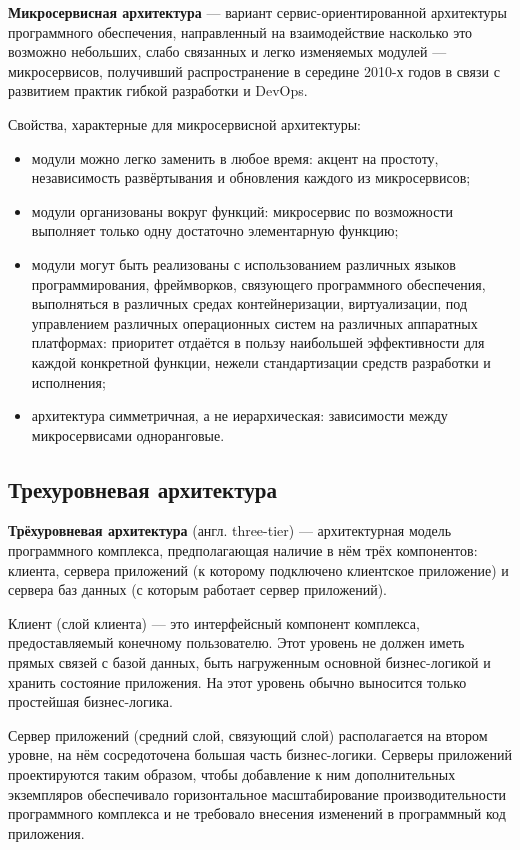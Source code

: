 \documentclass[specification,annotation,times]{itmo-student-thesis}
\begin{document}
\textbf{Микросервисная архитектура} \label{microservice-architecture} — вариант сервис-ориентированной архитектуры программного обеспечения, направленный на взаимодействие насколько это возможно небольших, слабо связанных и легко изменяемых модулей — микросервисов, получивший распространение в середине 2010-х годов в связи с развитием практик гибкой разработки и DevOps.

Свойства, характерные для микросервисной архитектуры:
\begin{itemize}
\item модули можно легко заменить в любое время: акцент на простоту, независимость развёртывания и обновления каждого из микросервисов;
\item модули организованы вокруг функций: микросервис по возможности выполняет только одну достаточно элементарную функцию;
\item модули могут быть реализованы с использованием различных языков программирования, фреймворков, связующего программного обеспечения, выполняться в различных средах контейнеризации, виртуализации, под управлением различных операционных систем на различных аппаратных платформах: приоритет отдаётся в пользу наибольшей эффективности для каждой конкретной функции, нежели стандартизации средств разработки и исполнения;
\item архитектура симметричная, а не иерархическая: зависимости между микросервисами одноранговые.
\end{itemize}

\subsection{Трехуровневая архитектура }

\textbf{Трёхуровневая архитектура} (англ. three-tier) \label{three-tier-architecture} — архитектурная модель программного комплекса, предполагающая наличие в нём трёх компонентов: клиента, сервера приложений (к которому подключено клиентское приложение) и сервера баз данных (с которым работает сервер приложений).

Клиент (слой клиента) — это интерфейсный компонент комплекса, предоставляемый конечному пользователю. Этот уровень не должен иметь прямых связей с базой данных, быть нагруженным основной бизнес-логикой и хранить состояние приложения. На этот уровень обычно выносится только простейшая бизнес-логика.

Сервер приложений (средний слой, связующий слой) располагается на втором уровне, на нём сосредоточена большая часть бизнес-логики. Серверы приложений проектируются таким образом, чтобы добавление к ним дополнительных экземпляров обеспечивало горизонтальное масштабирование производительности программного комплекса и не требовало внесения изменений в программный код приложения.
\end{document}
